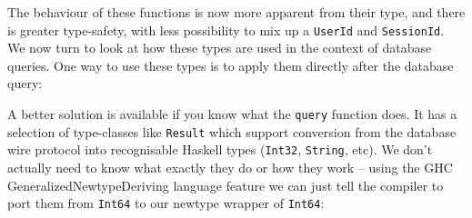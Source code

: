 \documentclass{tmr}
\begin{document}
The behaviour of these functions is now more apparent from their type, and there is greater type-safety, with less possibility to mix up a \lstinline|UserId| and \lstinline|SessionId|.  We now turn to look at how these types are used in the context of database queries.
%
%
%
%
%
%
%
One way to use these types is to apply them directly after the database query:


A better solution is available if you know what the \lstinline|query| function does.  It has a selection of type-classes like \lstinline|Result| which support conversion from the database wire protocol into recognisable Haskell types (\lstinline|Int32|, \lstinline|String|, etc).  We don't actually need to know what exactly they do or how they work -- using the GHC GeneralizedNewtypeDeriving language feature we can just tell the compiler to port them from \lstinline|Int64| to our newtype wrapper of \lstinline|Int64|:
\end{document}
